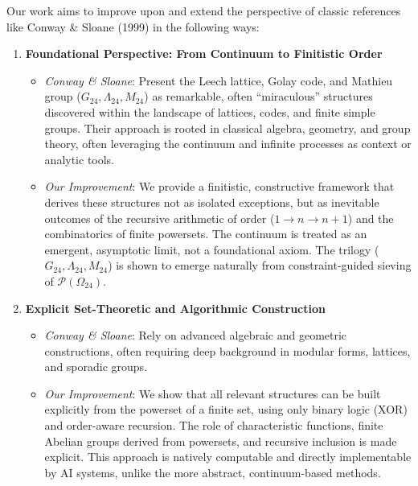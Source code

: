 \documentclass[11pt,a4paper]{article}
\begin{document}
Our work aims to improve upon and extend the perspective of classic references like Conway \& Sloane (1999) in the following ways:

\begin{enumerate}
    \item \textbf{Foundational Perspective: From Continuum to Finitistic Order}
    \begin{itemize}
        \item \textit{Conway \& Sloane}: Present the Leech lattice, Golay code, and Mathieu group ($G_{24}, \Lambda_{24}, M_{24}$) as remarkable, often “miraculous” structures discovered within the landscape of lattices, codes, and finite simple groups. Their approach is rooted in classical algebra, geometry, and group theory, often leveraging the continuum and infinite processes as context or analytic tools.
        \item \textit{Our Improvement}: We provide a finitistic, constructive framework that derives these structures not as isolated exceptions, but as inevitable outcomes of the recursive arithmetic of order ($1 \to n \to n+1$) and the combinatorics of finite powersets. The continuum is treated as an emergent, asymptotic limit, not a foundational axiom. The trilogy ($G_{24}, \Lambda_{24}, M_{24}$) is shown to emerge naturally from constraint-guided sieving of $\mathcal{P}(\Omega_{24})$.
    \end{itemize}

    \item \textbf{Explicit Set-Theoretic and Algorithmic Construction}
    \begin{itemize}
        \item \textit{Conway \& Sloane}: Rely on advanced algebraic and geometric constructions, often requiring deep background in modular forms, lattices, and sporadic groups.
        \item \textit{Our Improvement}: We show that all relevant structures can be built explicitly from the powerset of a finite set, using only binary logic (XOR) and order-aware recursion. The role of characteristic functions, finite Abelian groups derived from powersets, and recursive inclusion is made explicit. This approach is natively computable and directly implementable by AI systems, unlike the more abstract, continuum-based methods.
    \end{itemize}


\end{enumerate}
\end{document}
